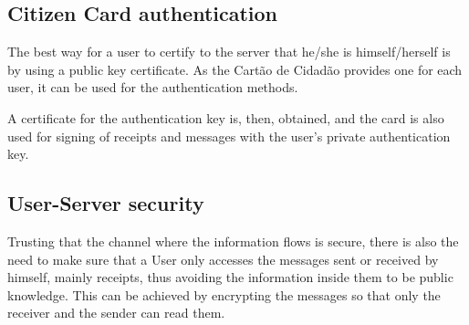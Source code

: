 \subsection{Citizen Card authentication}
The best way for a user to certify to the server that he/she is himself/herself is by using a public key certificate. As the Cartão de Cidadão provides one for each user, it can be used for the authentication methods.

A certificate for the authentication key is, then, obtained, and the card is also used for signing of receipts and messages with the user's private authentication key.

\subsection{User-Server security}
Trusting that the channel where the information flows is secure, there is also the need to make sure that a User only accesses the messages sent or received by himself, mainly receipts, thus avoiding the information inside them to be public knowledge. This can be achieved by encrypting the messages so that only the receiver and the sender can read them.

